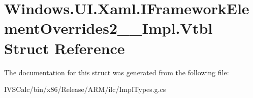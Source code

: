 \hypertarget{struct_windows_1_1_u_i_1_1_xaml_1_1_i_framework_element_overrides2_____impl_1_1_vtbl}{}\section{Windows.\+U\+I.\+Xaml.\+I\+Framework\+Element\+Overrides2\+\_\+\+\_\+\+Impl.\+Vtbl Struct Reference}
\label{struct_windows_1_1_u_i_1_1_xaml_1_1_i_framework_element_overrides2_____impl_1_1_vtbl}


The documentation for this struct was generated from the following file\+:\begin{DoxyCompactItemize}
\item 
I\+V\+S\+Calc/bin/x86/\+Release/\+A\+R\+M/ilc/Impl\+Types.\+g.\+cs\end{DoxyCompactItemize}
